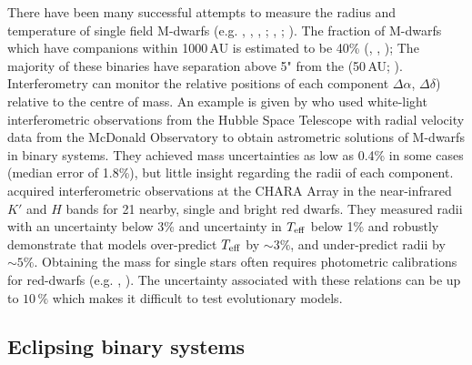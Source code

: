     There have been many successful attempts to measure the radius and temperature of single field M-dwarfs (e.g. \citealt{1997A&A...325..159L}, \citealt{2006ApJ...644..475B}, \citealt{2001AAS...198.5120N}, \citealt{2003A&A...397L...5S}; \citealt{2009A&A...505..205D},  \citealt{2012ApJ...757..112B}; \citealt{2015csss...18..839V}). The fraction of M-dwarfs which have companions within 1000\,AU is estimated to be 40\% (\citealt{1992ApJ...396..178F}, \citealt{2006ApJ...640L..63L}, \citealt{2010ApJS..190....1R}); The majority of these binaries have separation above 5" from the  (50\,AU; \citealt{2015ApJ...804...64M}). Interferometry can monitor the relative positions of each component $\Delta \alpha$, $\Delta \delta$) relative to the centre of mass. An example is given by \citet{2016AJ....152..141B} who used white-light interferometric observations from the Hubble Space Telescope with radial velocity data from the McDonald Observatory to obtain astrometric solutions of M-dwarfs in binary systems. They achieved mass uncertainties as low as 0.4\% in some cases (median error of 1.8\%), but little insight regarding the radii of each component. \citet{2012ApJ...757..112B} acquired interferometric observations at the CHARA Array in the near-infrared $K'$ and $H$ bands \citep{2005ApJ...628..453T} for 21 nearby, single and bright red dwarfs. They measured radii with an uncertainty below 3\% and uncertainty in $T_{\rm eff}$ below 1\% and robustly demonstrate that models over-predict $T_{\rm eff}$ by $\sim3\%$, and under-predict radii by $\sim5\%$. Obtaining the mass for single stars often requires photometric calibrations for red-dwarfs (e.g. \citealt{1993AJ....106..773H}, \citealt{2000A&A...364..217D}). The  uncertainty associated with these relations can be up to $10\,\%$ which makes it difficult to test evolutionary models. 
    
    
    \subsection{Eclipsing binary systems}
    
